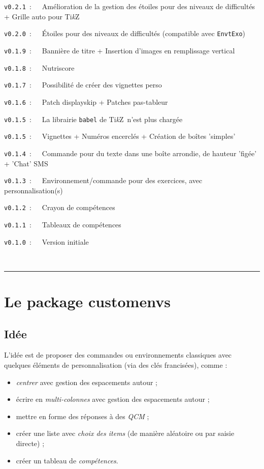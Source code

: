 \documentclass[french,11pt,a4paper]{article}
\providecommand\tikzlogo{Ti\textit{k}Z}
\let\TikZ\tikzlogo
\begin{document}
\verb|v0.2.1|~:~~~Amélioration de la gestion des étoiles pour des niveaux de difficultés + Grille auto pour \TikZ\

\verb|v0.2.0|~:~~~Étoiles pour des niveaux de difficultés (compatible avec \texttt{EnvtExo})

\verb|v0.1.9|~:~~~Bannière de titre + Insertion d'images en remplissage vertical

\verb|v0.1.8|~:~~~Nutriscore

\verb|v0.1.7|~:~~~Possibilité de créer des vignettes \textsf{perso}

\verb|v0.1.6|~:~~~Patch \textsf{displayskip} + Patches \textsf{pas-tableur}

\verb|v0.1.5|~:~~~La librairie \texttt{babel} de \TikZ\ n'est plus chargée

\verb|v0.1.5|~:~~~Vignettes + Numéros encerclés + Création de boîtes 'simples'

\verb|v0.1.4|~:~~~Commande pour du texte dans une boîte arrondie, de hauteur 'figée' + 'Chat' SMS

\verb|v0.1.3|~:~~~Environnement/commande pour des exercices, avec personnalisation(s)

\verb|v0.1.2|~:~~~Crayon de compétences

\verb|v0.1.1|~:~~~Tableaux de compétences

\verb|v0.1.0|~:~~~Version initiale

~

\hrule

\pagebreak

\section{Le package customenvs}

\subsection{Idée}

L'idée est de proposer des commandes ou environnements classiques avec quelques éléments de personnalisation (via des \textsf{clés} francisées), comme :

\begin{itemize}
	\item \textit{centrer} avec gestion des espacements autour ;
	\item écrire en \textit{multi-colonnes} avec gestion des espacements autour ;
	\item mettre en forme des réponses à des \textit{QCM} ;
	\item créer une liste avec \textit{choix des items} (de manière aléatoire ou par saisie directe) ;
	\item créer un tableau de \textit{compétences}.
\end{itemize}
\end{document}
